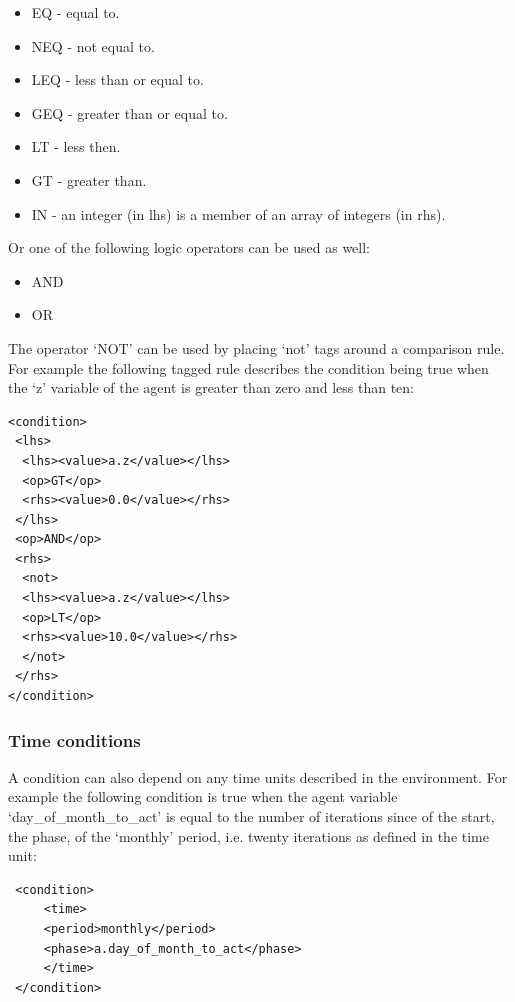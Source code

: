 \documentclass[a4paper,11pt]{article}
\newenvironment{mylisting}
{\begin{list}{}{\setlength{\leftmargin}{1em}}\item\small\bfseries}
{\end{list}}
\begin{document}
\begin{itemize}
\item EQ - equal to.
\item NEQ - not equal to.
\item LEQ - less than or equal to.
\item GEQ - greater than or equal to.
\item LT - less then.
\item GT - greater than.
\item IN - an integer (in lhs) is a member of an array of integers (in rhs).
\end{itemize}

Or one of the following logic operators can be used as well:

\begin{itemize}
\item AND
\item OR
\end{itemize}

The operator `NOT' can be used by placing `not' tags around a
comparison rule. For example the following tagged rule describes the
condition being true when the `z' variable of the agent is greater
than zero and less than ten:

\begin{mylisting}
\begin{verbatim}
<condition>
 <lhs>
  <lhs><value>a.z</value></lhs>
  <op>GT</op>
  <rhs><value>0.0</value></rhs>
 </lhs>
 <op>AND</op>
 <rhs>
  <not>
  <lhs><value>a.z</value></lhs>
  <op>LT</op>
  <rhs><value>10.0</value></rhs>
  </not>
 </rhs>
</condition>
\end{verbatim}
\end{mylisting}

\subsubsection{Time conditions}

A condition can also depend on any time units described in the
environment. For example the following condition is true when the
agent variable `day\_of\_month\_to\_act' is equal to the number of
iterations since of the start, the phase, of the `monthly' period,
i.e. twenty iterations as defined in the time unit:

\begin{mylisting}
\begin{verbatim}
 <condition>
     <time>
     <period>monthly</period>
     <phase>a.day_of_month_to_act</phase>
     </time>
 </condition>
\end{verbatim}
\end{mylisting}
\end{document}
